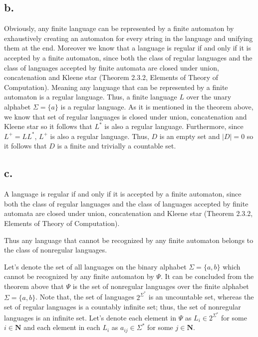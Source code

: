 \documentclass[12pt]{article}
\begin{document}
\subsection*{b.}

Obviously, any finite language can be represented by a finite automaton by exhaustively creating an automaton for every string in the language and unifying them at the end. Moreover we know that a language is regular if and only if it is accepted by a finite automaton, since both the class of regular languages and the class of languages accepted by finite automata are closed under union, concatenation and Kleene star (Theorem 2.3.2, Elements of Theory of Computation). Meaning any language that can be represented by a finite automaton is a regular language. Thus, a finite language $L$ over the unary alphabet $\Sigma = \{a\}$ is a regular language. As it is mentioned in the theorem above, we know that set of regular languages is closed under union, concatenation and Kleene star so it follows that $L^*$ is also a regular language. Furthermore, since $L^+ = LL^*$, $L^+$ is also a regular language. Thus, $D$ is an empty set and $|D| = 0$ so it follows that $D$ is a finite and trivially a countable set.


\subsection*{c.} 

A language is regular if and only if it is accepted by a finite automaton, since both the class of regular languages and the class of languages accepted by finite automata are closed under union, concatenation and Kleene star (Theorem 2.3.2, Elements of Theory of Computation).

Thus any language that cannot be recognized by any finite automaton belongs to the class of nonregular languages.

Let's denote the set of all languages on the binary alphabet $\Sigma = \{a, b\}$ which cannot be recognized by any finite automaton by $\Psi$. It can be concluded from the theorem above that $\Psi$ is the set of nonregular languages over the finite alphabet $\Sigma = \{a, b\}$. Note that, the set of languages $2^{\Sigma^*}$ is an uncountable set, whereas the set of regular languages is a countably infinite set; thus, the set of nonregular languages is an infinite set. Let's denote each element in $\Psi$ as $L_i \in 2^{\Sigma^*}$ for some $i \in \mathbf{N}$ and each element in each $L_i$ as $a_{ij} \in \Sigma^*$ for some $j \in \mathbf{N}$.
\end{document}
